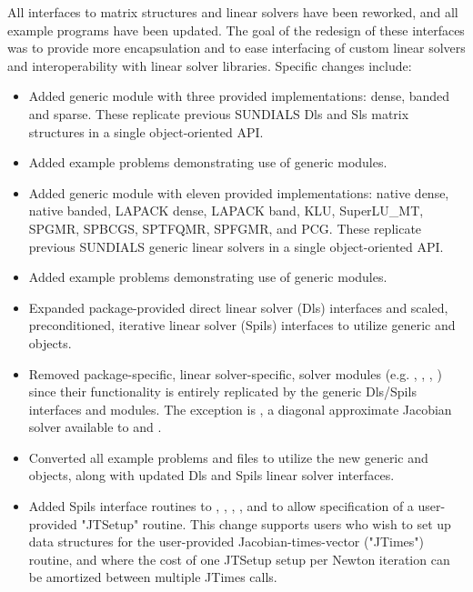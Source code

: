 All interfaces to matrix structures and linear solvers 
have been reworked, and all example programs have been updated. 
The goal of the redesign of these interfaces was to provide more encapsulation
and to ease interfacing of custom linear solvers and interoperability 
with linear solver libraries.
Specific changes include:
\begin{itemize}
\item Added generic {\sunmatrix} module with three provided implementations:
        dense, banded and sparse.  These replicate previous SUNDIALS Dls and
        Sls matrix structures in a single object-oriented API.
\item Added example problems demonstrating use of generic {\sunmatrix} modules.
\item Added generic  module with eleven provided
        implementations: {\sundials} native dense, {\sundials} native banded, 
        LAPACK dense, LAPACK band, KLU,
        SuperLU\_MT, SPGMR, SPBCGS, SPTFQMR, SPFGMR, and PCG.  These replicate
        previous SUNDIALS generic linear solvers in a single object-oriented
        API.
\item Added example problems demonstrating use of generic 
        modules.
\item Expanded package-provided direct linear solver (Dls) interfaces and
        scaled, preconditioned, iterative linear solver (Spils) interfaces
        to utilize generic {\sunmatrix} and  objects.
\item Removed package-specific, linear solver-specific, solver modules
        (e.g. , , , ) since their functionality
        is entirely replicated by the generic Dls/Spils interfaces and
         modules.  The exception is , a
        diagonal approximate Jacobian solver available to {\cvode} and {\cvodes}.
\item Converted all {\sundials} example problems and files to utilize the new generic
        {\sunmatrix} and  objects, along with updated Dls and
        Spils linear solver interfaces.
\item Added Spils interface routines to {\arkode}, {\cvode}, {\cvodes}, {\ida},
        and {\idas} to allow specification of a user-provided "JTSetup" routine.
        This change supports users who wish to set up data structures for
        the user-provided Jacobian-times-vector ("JTimes") routine, and
        where the cost of one JTSetup setup per Newton iteration can be
        amortized between multiple JTimes calls.
\end{itemize}

